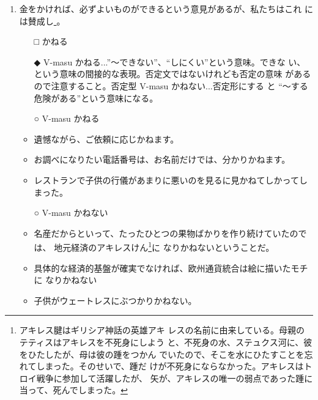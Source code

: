 \documentclass[
uplatex,
b5paper,
10pt,
dvipdfmx
]{jsbook}
\begin{document}
\begin{enumerate}
\item 金をかければ、必ずよいものができるという意見があるが、私たちはこれ
      には賛成し\underline{   }。

\begin{itemize}
\item[□] かねる
\item[◆] V-masu かねる...''〜できない''、``しにくい''という意味。できな
	  い、という意味の間接的な表現。否定文ではないけれども否定の意味
	  があるので注意すること。否定型 V-masu かねない...否定形にする
	  と ``〜する危険がある''という意味になる。
\end{itemize}

\begin{itemize}
 \item[○] V-masu かねる
\end{itemize}
\begin{itemize}
 \item 遺憾ながら、ご依頼に応じかねます。
 \item お調べになりたい電話番号は、お名前だけでは、分かりかねます。
 \item レストランで子供の行儀があまりに悪いのを見るに見かねてしかってしまった。
\end{itemize}

\begin{itemize}
 \item[○] V-masu かねない
\end{itemize}
\begin{itemize}
\item 名産だからといって、たったひとつの果物ばかりを作り続けていたのでは、
      地元経済のアキレスけん\footnote{アキレス腱はギリシア神話の英雄アキ
      レスの名前に由来している。母親のテティスはアキレスを不死身にしよう
      と、不死身の水、ステュクス河に、彼をひたしたが、母は彼の踵をつかん
      でいたので、そこを水にひたすことを忘れてしまった。そのせいで、踵だ
      けが不死身にならなかった。アキレスはトロイ戦争に参加して活躍したが、
      矢が、アキレスの唯一の弱点であった踵に当って、死んでしまった。}に
      なりかねないということだ。
\item 具体的な経済的基盤が確実でなければ、欧州通貨統合は絵に描いたモチに
      なりかねない
\item 子供がウェートレスにぶつかりかねない。
\end{itemize}


\end{enumerate}
\end{document}
